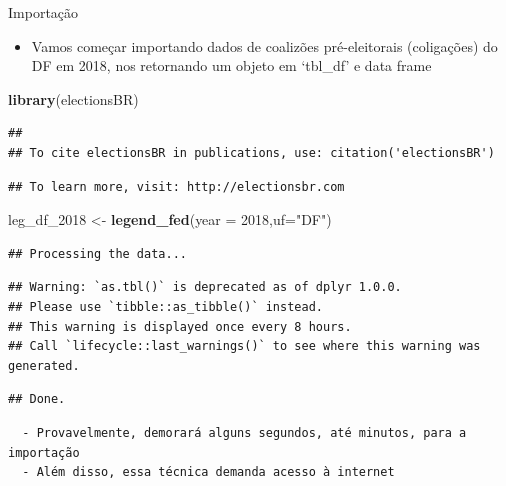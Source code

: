 \documentclass[
  10pt,
  ignorenonframetext,
]{beamer}
\newenvironment{Shaded}{\begin{snugshade}}{\end{snugshade}}
\newcommand{\DataTypeTok}[1]{\textcolor[rgb]{0.13,0.29,0.53}{#1}}
\newcommand{\DecValTok}[1]{\textcolor[rgb]{0.00,0.00,0.81}{#1}}
\newcommand{\KeywordTok}[1]{\textcolor[rgb]{0.13,0.29,0.53}{\textbf{#1}}}
\newcommand{\NormalTok}[1]{#1}
\newcommand{\StringTok}[1]{\textcolor[rgb]{0.31,0.60,0.02}{#1}}
\providecommand{\tightlist}{%
  \setlength{\itemsep}{0pt}\setlength{\parskip}{0pt}}
\begin{document}
\begin{frame}[fragile]{Importação}
\protect\hypertarget{importauxe7uxe3o}{}
\begin{itemize}
\tightlist
\item
  Vamos começar importando dados de coalizões pré-eleitorais
  (coligações) do DF em 2018, nos retornando um objeto em `tbl\_df' e
  data frame
\end{itemize}

\begin{Shaded}
\begin{Highlighting}[]
\KeywordTok{library}\NormalTok{(electionsBR)}
\end{Highlighting}
\end{Shaded}

\begin{verbatim}
## 
## To cite electionsBR in publications, use: citation('electionsBR')
\end{verbatim}

\begin{verbatim}
## To learn more, visit: http://electionsbr.com
\end{verbatim}

\begin{Shaded}
\begin{Highlighting}[]
\NormalTok{leg\_df\_}\DecValTok{2018}\NormalTok{ \textless{}{-}}\StringTok{ }\KeywordTok{legend\_fed}\NormalTok{(}\DataTypeTok{year =} \DecValTok{2018}\NormalTok{,}\DataTypeTok{uf=}\StringTok{"DF"}\NormalTok{)}
\end{Highlighting}
\end{Shaded}

\begin{verbatim}
## Processing the data...
\end{verbatim}

\begin{verbatim}
## Warning: `as.tbl()` is deprecated as of dplyr 1.0.0.
## Please use `tibble::as_tibble()` instead.
## This warning is displayed once every 8 hours.
## Call `lifecycle::last_warnings()` to see where this warning was generated.
\end{verbatim}

\begin{verbatim}
## Done.
\end{verbatim}

\begin{verbatim}
  - Provavelmente, demorará alguns segundos, até minutos, para a importação
  - Além disso, essa técnica demanda acesso à internet
\end{verbatim}
\end{frame}
\end{document}
